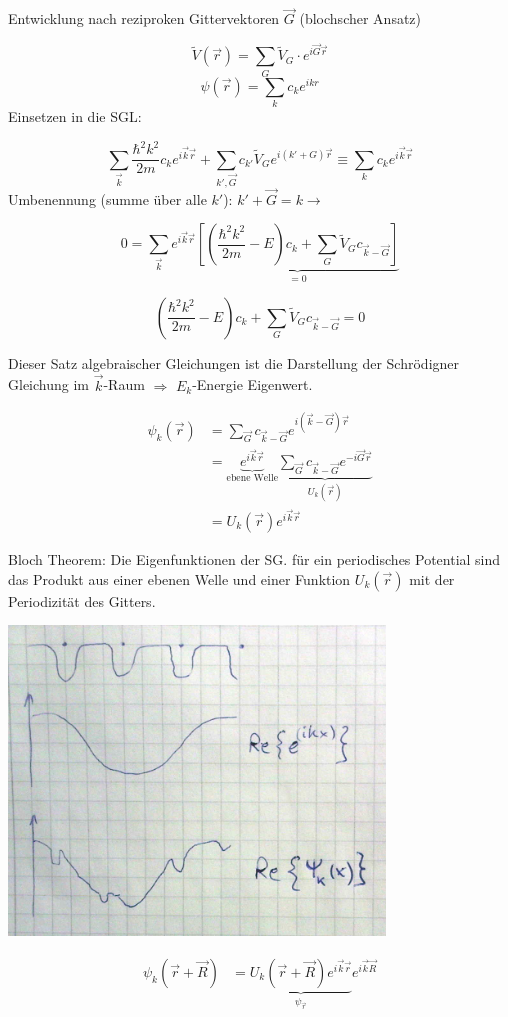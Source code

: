 Entwicklung nach reziproken Gittervektoren \(\vec G\) (blochscher Ansatz)

\[\tilde V(\vec r) = \sum_G\tilde V_G\cdot e^{i\vec G\vec r}\]
\[\psi(\vec r) = \sum_{k}c_ke^{ikr}\]
Einsetzen in die SGL:

\[\sum_{\vec k}\frac{\hbar^2 k^2}{2m}c_ke^{i\vec k\vec r}+\sum_{k',\vec G}c_{k'}\tilde V_G e^{i(k'+G)\vec r}\equiv \sum_kc_ke^{i\vec k\vec r}\]
Umbenennung (summe über alle \(k'\)): \(k'+\vec G = k \rightarrow \)

\[0=\sum_{\vec k}e^{i\vec k\vec r}\underbrace{\left[(\frac{\hbar^2 k^2}{2m}-E)c_k+\sum_G\tilde V_G c_{\vec k-\vec G}\right]}_{=0}\]


\[(\frac{\hbar^2 k^2}{2m}-E)c_k+\sum_G\tilde V_G c_{\vec k-\vec G}=0\]

Dieser Satz algebraischer Gleichungen ist die Darstellung der Schrödigner Gleichung im \(\vec k\)-Raum \(\Rightarrow\) \(E_k\)-Energie Eigenwert.

\begin{align}
\psi_k(\vec r) &= \sum_{\vec G}c_{\vec k-\vec G}e^{i(\vec k-\vec G)\vec r}\\
&= \underbrace{e^{i\vec k\vec r}}_{\text{ebene Welle}}\underbrace{\sum_{\vec G}c_{\vec k-\vec G}e^{-i\vec G\vec r}}_{U_k(\vec r)}\\
&= U_k(\vec r)e^{i\vec k\vec r}
\end{align}

Bloch Theorem: Die Eigenfunktionen der SG. für ein periodisches Potential sind das Produkt aus einer ebenen Welle und einer Funktion \(U_k(\vec r)\) mit der Periodizität des Gitters. 


\includegraphics[width=0.75\textwidth]{kap06_35.png}
 
\begin{align}
\psi_k(\vec r+\vec R) &= \underbrace{U_k(\vec r+\vec R)e^{i\vec k\vec r}}_{\psi_{\vec r}}e^{i\vec k\vec R}
\end{align}


